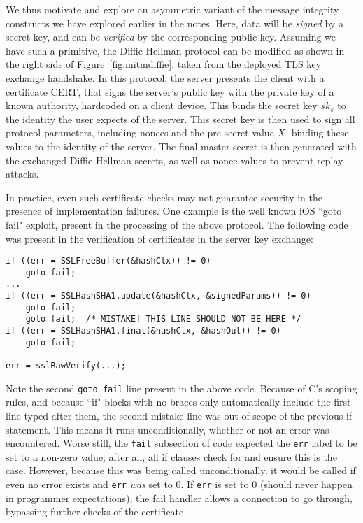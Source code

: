 We thus motivate and explore an asymmetric variant of the message integrity constructs we have explored earlier in the notes.  Here, data will be \emph{signed} by a secret key, and can be \emph{verified} by the corresponding public key.  Assuming we have such a primitive, the Diffie-Hellman protocol can be modified as shown in the right side of Figure~\ref{fig:mitmdiffie}, taken from the deployed TLS key exchange handshake.  In this protocol, the server presents the client with a certificate CERT, that signs the server's public key with the private key of a known authority, hardcoded on a client device.  This binds the secret key $sk_s$ to the identity the user expects of the server.  This secret key is then used to sign all protocol parameters, including nonces and the pre-secret value $X$, binding these values to the identity of the server.  The final master secret is then generated with the exchanged Diffie-Hellman secrets, as well as nonce values to prevent replay attacks.

In practice, even such certificate checks may not guarantee security in the presence of implementation failures.  One example is the well known iOS ``goto fail" exploit, present in the processing of the above protocol.  The following code was present in the verification of certificates in the server key exchange:

\begin{verbatim}
if ((err = SSLFreeBuffer(&hashCtx)) != 0)
    goto fail;
...
if ((err = SSLHashSHA1.update(&hashCtx, &signedParams)) != 0)
    goto fail;
    goto fail;  /* MISTAKE! THIS LINE SHOULD NOT BE HERE */
if ((err = SSLHashSHA1.final(&hashCtx, &hashOut)) != 0)
    goto fail;

err = sslRawVerify(...);
\end{verbatim}

Note the second \texttt{goto fail} line present in the above code.  Because of C's scoping rules, and because ``if" blocks with no braces only automatically include the first line typed after them, the second mistake line was out of scope of the previous if statement.  This means it runs unconditionally, whether or not an error was encountered.  Worse still, the \texttt{fail} subsection of code expected the \texttt{err} label to be set to a non-zero value; after all, all if clauses check for and ensure this is the case.  However, because this was being called unconditionally, it would be called if even no error exists and \texttt{err} \emph{was} set to 0.  If \texttt{err} is set to 0 (should never happen in programmer expectations), the fail handler allows a connection to go through, bypassing further checks of the certificate.

